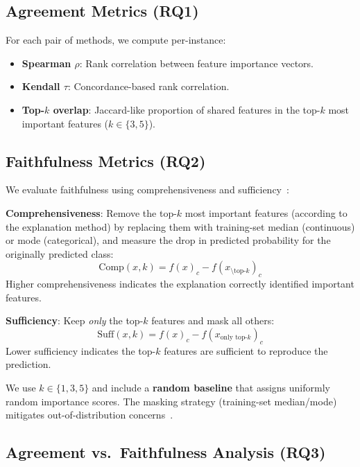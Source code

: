 \documentclass[conference, 10pt]{IEEEtran}
\begin{document}
\subsection{Agreement Metrics (RQ1)}

For each pair of methods, we compute per-instance:
\begin{itemize}[leftmargin=*]
    \item \textbf{Spearman $\rho$}: Rank correlation between feature importance vectors.
    \item \textbf{Kendall $\tau$}: Concordance-based rank correlation.
    \item \textbf{Top-$k$ overlap}: Jaccard-like proportion of shared features in the top-$k$ most important features ($k \in \{3, 5\}$).
\end{itemize}

\subsection{Faithfulness Metrics (RQ2)}

We evaluate faithfulness using comprehensiveness and sufficiency~\cite{deyoung2020eraser}:

\textbf{Comprehensiveness}: Remove the top-$k$ most important features (according to the explanation method) by replacing them with training-set median (continuous) or mode (categorical), and measure the drop in predicted probability for the originally predicted class:
\begin{equation}
    \text{Comp}(x, k) = f(x)_c - f(x_{\setminus \text{top-}k})_c
\end{equation}
Higher comprehensiveness indicates the explanation correctly identified important features.

\textbf{Sufficiency}: Keep \emph{only} the top-$k$ features and mask all others:
\begin{equation}
    \text{Suff}(x, k) = f(x)_c - f(x_{\text{only top-}k})_c
\end{equation}
Lower sufficiency indicates the top-$k$ features are sufficient to reproduce the prediction.

We use $k \in \{1, 3, 5\}$ and include a \textbf{random baseline} that assigns uniformly random importance scores. The masking strategy (training-set median/mode) mitigates out-of-distribution concerns~\cite{hooker2019benchmark}.

\subsection{Agreement vs.\ Faithfulness Analysis (RQ3)}
\end{document}
